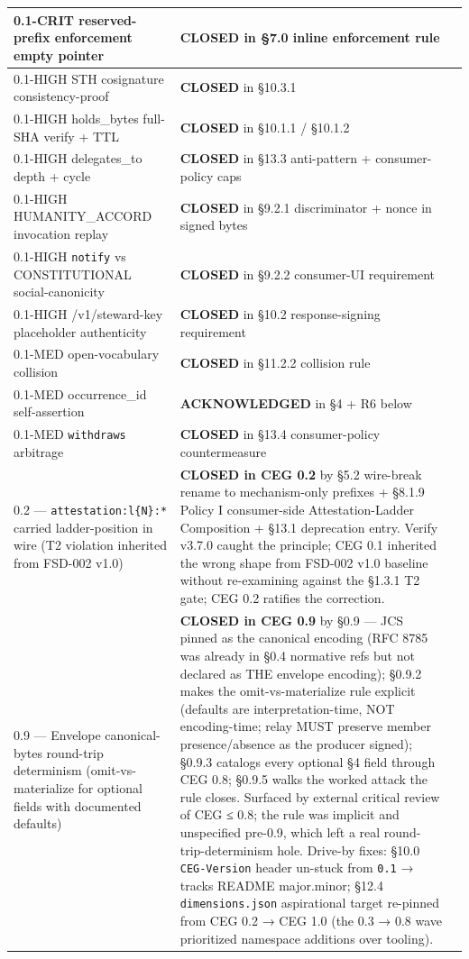 \documentclass[11pt]{article}
\begin{document}
{\begin{longtable}{|p{5.33cm}|p{5.33cm}|p{5.33cm}|}
0.1-CRIT reserved-prefix enforcement empty pointer & \textbf{CLOSED} in §7.0 inline enforcement rule &  \\ \hline
0.1-HIGH STH cosignature consistency-proof & \textbf{CLOSED} in §10.3.1 &  \\ \hline
0.1-HIGH holds\_bytes full-SHA verify + TTL & \textbf{CLOSED} in §10.1.1 / §10.1.2 &  \\ \hline
0.1-HIGH delegates\_to depth + cycle & \textbf{CLOSED} in §13.3 anti-pattern + consumer-policy caps &  \\ \hline
0.1-HIGH HUMANITY\_ACCORD invocation replay & \textbf{CLOSED} in §9.2.1 discriminator + nonce in signed bytes &  \\ \hline
0.1-HIGH \texttt{notify} vs CONSTITUTIONAL social-canonicity & \textbf{CLOSED} in §9.2.2 consumer-UI requirement &  \\ \hline
0.1-HIGH /v1/steward-key placeholder authenticity & \textbf{CLOSED} in §10.2 response-signing requirement &  \\ \hline
0.1-MED open-vocabulary collision & \textbf{CLOSED} in §11.2.2 collision rule &  \\ \hline
0.1-MED occurrence\_id self-assertion & \textbf{ACKNOWLEDGED} in §4 + R6 below &  \\ \hline
0.1-MED \texttt{withdraws} arbitrage & \textbf{CLOSED} in §13.4 consumer-policy countermeasure &  \\ \hline
0.2 — \texttt{attestation:l\{N\}:*} carried ladder-position in wire (T2 violation inherited from FSD-002 v1.0) & \textbf{CLOSED in CEG 0.2} by §5.2 wire-break rename to mechanism-only prefixes + §8.1.9 Policy I consumer-side Attestation-Ladder Composition + §13.1 deprecation entry. Verify v3.7.0 caught the principle; CEG 0.1 inherited the wrong shape from FSD-002 v1.0 baseline without re-examining against the §1.3.1 T2 gate; CEG 0.2 ratifies the correction. &  \\ \hline
0.9 — Envelope canonical-bytes round-trip determinism (omit-vs-materialize for optional fields with documented defaults) & \textbf{CLOSED in CEG 0.9} by §0.9 — JCS pinned as the canonical encoding (RFC 8785 was already in §0.4 normative refs but not declared as THE envelope encoding); §0.9.2 makes the omit-vs-materialize rule explicit (defaults are interpretation-time, NOT encoding-time; relay MUST preserve member presence/absence as the producer signed); §0.9.3 catalogs every optional §4 field through CEG 0.8; §0.9.5 walks the worked attack the rule closes. Surfaced by external critical review of CEG ≤ 0.8; the rule was implicit and unspecified pre-0.9, which left a real round-trip-determinism hole. Drive-by fixes: §10.0 \texttt{CEG-Version} header un-stuck from \texttt{0.1} → tracks README major.minor; §12.4 \texttt{dimensions.json} aspirational target re-pinned from CEG 0.2 → CEG 1.0 (the 0.3 → 0.8 wave prioritized namespace additions over tooling). &  \\ \hline

\end{longtable}}
\end{document}
